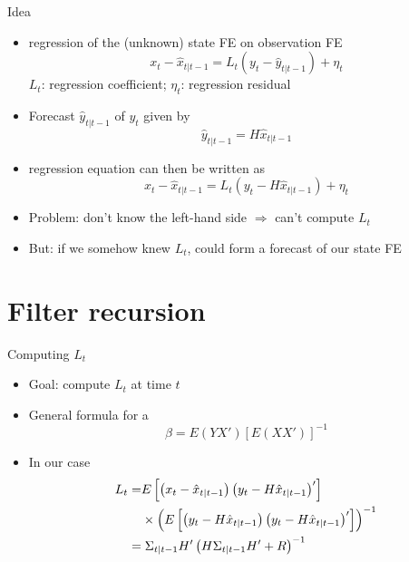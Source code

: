\documentclass[handout,usepdftitle=false,xcolor=dvipsnames,aspectratio=169]{beamer}
\begin{document}
\begin{frame}{Idea}
  \begin{itemize}
    \item regression of the (unknown) state FE on observation FE
          \begin{equation}
            {x_t} - {{\hat x}_{t|t-1}} = L_t\left( {{y_t} - \hat y_{t|t-1}} \right) + \eta_t
          \end{equation}
          $L_t$: regression coefficient; $\eta_t$: regression residual\vspace{0.2cm}

    \item Forecast $\hat y_{t|t-1}$ of $y_t$ given by
          \begin{equation}
            \hat y_{t|t-1}=H\hat x_{t|t-1}
          \end{equation}

    \item regression equation can then be written as
          \begin{equation}\label{eq:regression}
            {x_t} - {{\hat x}_{t|t-1}} = L_t\left( {{y_t} - H{{\hat x}_{t|t-1}}} \right) + \eta_t
          \end{equation}

    \item Problem: don't know the left-hand side $\Rightarrow$ can't compute $L_t$\vspace{0.2cm}
    \item But: if we somehow knew $L_t$, could form a forecast of our state FE
  \end{itemize}
\end{frame}

\section[Recursion]{Filter recursion}
\begin{frame}{Computing $L_t$}
  \begin{itemize}
    \item Goal: compute $L_t$ at time $t$\vspace{0.2cm}
    \item General formula for a 
          \begin{equation*}
            \beta  = E\left(YX'\right)\left[ E\left( XX' \right) \right]^{-1}
          \end{equation*}
    \item In our case
          \begin{align}
            L_t = & E\left[\left( {{x_t} - {\hat x}_{t|t-1}} \right)\left( y_t - H\hat{x}_{t|t-1} \right)' \right]\notag                            \\
                  & \times{\left(E\left[ \left( y_t - H\hat{x}_{t|t-1} \right)\left( y_t - H\hat{x}_{t|t-1} \right)' \right] \right)^{ - 1}} \notag \\
            =     & \; \Sigma _{t|t-1}H'\left(H\Sigma_{t|t-1}H' + R \right)^{ - 1}
          \end{align}
  \end{itemize}
\end{frame}
\end{document}
